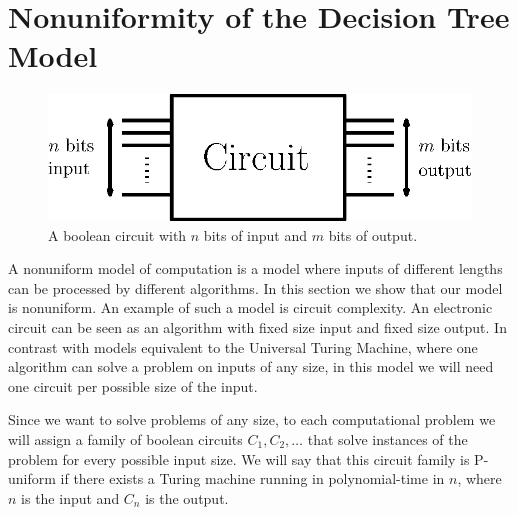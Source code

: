 \section{Nonuniformity of the Decision Tree Model}
\label{tree:sorting:nonuniformity}

\begin{figure}
\center
\includegraphics[height=0.15\textheight]{fig/sorting/model/circuit}
\caption{A boolean circuit with \(n\) bits of input and \(m\) bits of output.}
\label{fig:sorting:nonuniformity:circuit}
\end{figure}

A nonuniform model of computation is a model where inputs of different
lengths can be processed by different algorithms. In this section we show that
our model is nonuniform. An example of such a model is circuit complexity. An
electronic circuit can be seen as an algorithm with fixed size input and fixed
size output. In contrast with models equivalent to the Universal Turing
Machine, where one algorithm can solve a problem on inputs of any size, in this
model we will need one circuit per possible size of the input.

Since we want to solve problems of any size, to each computational problem we
will assign a family of boolean circuits \(C_1,C_2,\ldots\) that solve
instances of the problem for every possible input size. We will say that this
circuit family is P-uniform if there exists a Turing machine running in
polynomial-time in \(n\), where \(n\) is the input and \(C_n\) is the output.

